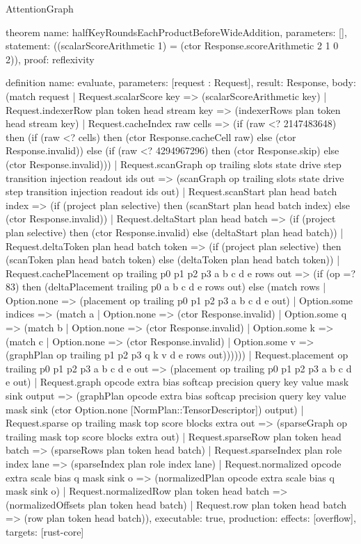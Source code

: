 \begin{lexlean}{AttentionGraph}
\begin{semanticmodule}
theorem{
  name: halfKeyRoundsEachProductBeforeWideAddition,
  parameters: [],
  statement: ((scalarScoreArithmetic 1) = (ctor Response.scoreArithmetic 2 1 0 2)),
  proof: reflexivity{}
}

definition{
  name: evaluate,
  parameters: [request : Request],
  result: Response,
  body: (match request
    | Request.scalarScore key => (scalarScoreArithmetic key)
    | Request.indexerRow plan token head stream key => (indexerRows plan token head stream key)
    | Request.cacheIndex raw cells => (if (raw <? 2147483648) then (if (raw <? cells) then (ctor Response.cacheCell raw) else (ctor Response.invalid)) else (if (raw <? 4294967296) then (ctor Response.skip) else (ctor Response.invalid)))
    | Request.scanGraph op trailing slots state drive step transition injection readout ids out => (scanGraph op trailing slots state drive step transition injection readout ids out)
    | Request.scanStart plan head batch index => (if (project plan selective) then (scanStart plan head batch index) else (ctor Response.invalid))
    | Request.deltaStart plan head batch => (if (project plan selective) then (ctor Response.invalid) else (deltaStart plan head batch))
    | Request.deltaToken plan head batch token => (if (project plan selective) then (scanToken plan head batch token) else (deltaToken plan head batch token))
    | Request.cachePlacement op trailing p0 p1 p2 p3 a b c d e rows out => (if (op =? 83) then (deltaPlacement trailing p0 a b c d e rows out) else (match rows
      | Option.none => (placement op trailing p0 p1 p2 p3 a b c d e out)
      | Option.some indices => (match a
        | Option.none => (ctor Response.invalid)
        | Option.some q => (match b
          | Option.none => (ctor Response.invalid)
          | Option.some k => (match c
            | Option.none => (ctor Response.invalid)
            | Option.some v => (graphPlan op trailing p1 p2 p3 q k v d e rows out))))))
    | Request.placement op trailing p0 p1 p2 p3 a b c d e out => (placement op trailing p0 p1 p2 p3 a b c d e out)
    | Request.graph opcode extra bias softcap precision query key value mask sink output => (graphPlan opcode extra bias softcap precision query key value mask sink (ctor Option.none [NormPlan::TensorDescriptor]) output)
    | Request.sparse op trailing mask top score blocks extra out => (sparseGraph op trailing mask top score blocks extra out)
    | Request.sparseRow plan token head batch => (sparseRows plan token head batch)
    | Request.sparseIndex plan role index lane => (sparseIndex plan role index lane)
    | Request.normalized opcode extra scale bias q mask sink o => (normalizedPlan opcode extra scale bias q mask sink o)
    | Request.normalizedRow plan token head batch => (normalizedOffsets plan token head batch)
    | Request.row plan token head batch => (row plan token head batch)),
  executable: true,
  production: {effects: [overflow], targets: [rust-core]}
}


\end{semanticmodule}
\end{lexlean}
